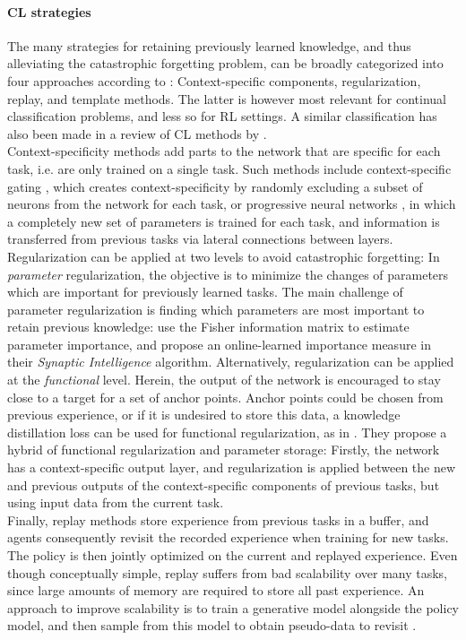 \documentclass[dvipsnames]{article} %
\newcommand{\commentOLD}[1]{}
\newcommand{\asOLD}[1] {\commentOLD{{\color{orange} AS: #1}}}              %
\begin{document}
\paragraph{CL strategies} The many strategies for retaining previously learned knowledge, and thus alleviating the catastrophic forgetting problem, can be broadly categorized into four approaches according to \citet{threescenarios2}: Context-specific components, regularization, replay, and template methods. The latter is however most relevant for continual classification problems, and less so for RL settings. A similar classification has also been made in a review of CL methods by \citet{towardsCRL}.\\
Context-specificity methods add parts to the network that are specific for each task, i.e. are only trained on a single task. Such methods include context-specific gating \citep{xdg}, which creates context-specificity by randomly excluding a subset of neurons from the network for each task, or progressive neural networks \citep{pnn}, in which a completely new set of parameters is trained for each task, and information is transferred from previous tasks via lateral connections between layers.\\
Regularization can be applied at two levels to avoid catastrophic forgetting: In \textit{parameter} regularization, the objective is to minimize the changes of parameters which are important for previously learned tasks. The main challenge of parameter regularization is finding which parameters are most important to retain previous knowledge: \citet{ewc} use the Fisher information matrix to estimate parameter importance, and \citet{synapticintelligence} propose an online-learned importance measure in their \textit{Synaptic Intelligence} algorithm. Alternatively, regularization can be applied at the \textit{functional} level. Herein, the output of the network is encouraged to stay close to a target for a set of anchor points. Anchor points could be chosen from previous experience, or if it is undesired to store this data, a knowledge distillation loss can be used for functional regularization, as in \citet{lwf}. They propose a hybrid of functional regularization and parameter storage: \asOLD{ok, and?. Make sure that what you write is informative} Firstly, the network has a context-specific output layer, and regularization is applied between the new and previous outputs of the context-specific components of previous tasks, but using input data from the current task.\\
Finally, replay methods store experience from previous tasks in a buffer, and agents consequently revisit the recorded experience when training for new tasks. The policy is then jointly optimized on the current and replayed experience. Even though conceptually simple, replay suffers from bad scalability over many tasks, since large amounts of memory are required to store all past experience. An approach to improve scalability is to train a generative model alongside the policy model, and then sample from this model to obtain pseudo-data to revisit \citep{generativeReplay}.
\end{document}
